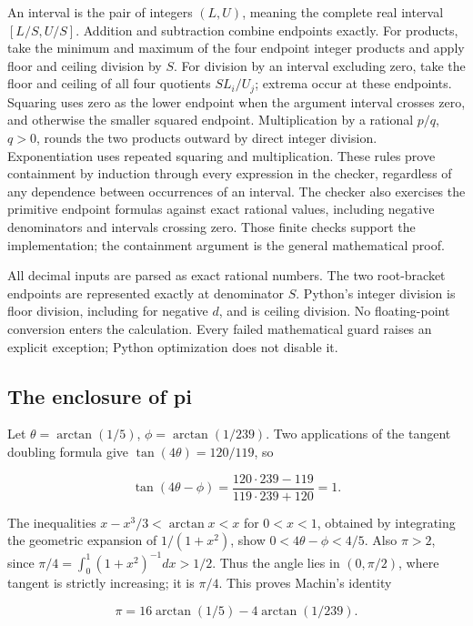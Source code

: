 \documentclass[11pt,a4paper]{article}
\begin{document}
An interval is the pair of integers $(L,U)$, meaning the complete real interval $[L/S,U/S]$. Addition and subtraction combine endpoints exactly. For products, take the minimum and maximum of the four endpoint integer products and apply floor and ceiling division by $S$. For division by an interval excluding zero, take the floor and ceiling of all four quotients $S L_i/U_j$; extrema occur at these endpoints. Squaring uses zero as the lower endpoint when the argument interval crosses zero, and otherwise the smaller squared endpoint. Multiplication by a rational $p/q$, $q>0$, rounds the two products outward by direct integer division. Exponentiation uses repeated squaring and multiplication. These rules prove containment by induction through every expression in the checker, regardless of any dependence between occurrences of an interval. The checker also exercises the primitive endpoint formulas against exact rational values, including negative denominators and intervals crossing zero. Those finite checks support the implementation; the containment argument is the general mathematical proof.

All decimal inputs are parsed as exact rational numbers. The two root-bracket endpoints are represented exactly at denominator $S$. Python's integer division \texttt{} is floor division, including for negative $d$, and \texttt{} is ceiling division. No floating-point conversion enters the calculation. Every failed mathematical guard raises an explicit exception; Python optimization does not disable it.

\subsection{The enclosure of pi}

Let $\theta=\arctan(1/5)$, $\phi=\arctan(1/239)$. Two applications of the tangent doubling formula give $\tan(4\theta)=120/119$, so

\[
 \tan(4\theta-\phi)
 =\frac{120\cdot239-119}{119\cdot239+120}=1.
\]

The inequalities $x-x^3/3<\arctan x<x$ for $0<x<1$, obtained by integrating the geometric expansion of $1/(1+x^2)$, show $0<4\theta-\phi<4/5$. Also $\pi>2$, since $\pi/4=\int_0^1(1+x^2)^{-1}dx>1/2$. Thus the angle lies in $(0,\pi/2)$, where tangent is strictly increasing; it is $\pi/4$. This proves Machin's identity

\[
 \pi=16\arctan(1/5)-4\arctan(1/239).
\]
\end{document}
